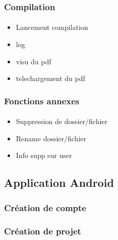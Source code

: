 \documentclass[a4paper,12pt]{article}
\begin{document}
\paragraph*{}

\subsubsection{Compilation}
\paragraph*{}
\begin{itemize}
 \item Lancement compilation
 \item log
 \item visu du pdf
 \item telechargement du pdf
\end{itemize}


\subsubsection{Fonctions annexes}
\paragraph*{}
\begin{itemize}
 \item Suppression de dossier/fichier
 \item Rename dossier/fichier
 \item Info supp sur user
\end{itemize}

\subsection{Application Android}
\subsubsection{Création de compte}
\paragraph*{}

\subsubsection{Création de projet}
\paragraph*{}
\end{document}
